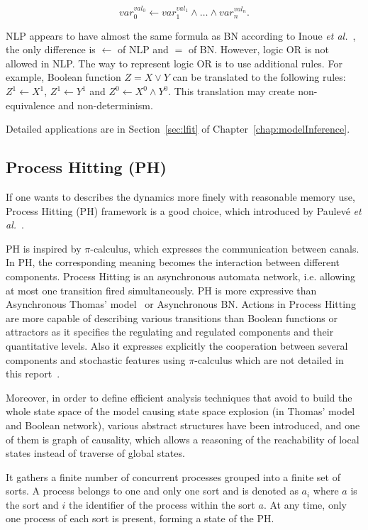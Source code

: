 $$var_0^{val_0} \gets var_1^{val_1}\land \ldots \land var_n^{val_n}.$$

\begin{remark}
NLP appears to have almost the same formula as BN according to Inoue \textit{et al.}~\cite{inoue2011logic}, the only difference is $\gets$ of NLP and $=$ of BN.
However, logic OR is not allowed in NLP.
The way to represent logic OR is to use additional rules.
For example, Boolean function $Z=X\lor Y$ can be translated to the following rules: $Z^1\gets X^1$, $Z^1\gets Y^1$ and $Z^0\gets X^0\land Y^0$.
This translation may create non-equivalence and non-determinism.
\end{remark}

Detailed applications are in Section~\ref{sec:lfit} of Chapter~\ref{chap:modelInference}.

\subsection{Process Hitting (PH)}
If one wants to describes the dynamics more finely with reasonable memory use, Process Hitting (PH) framework is a good choice, which introduced by Paulev\'e \textit{et al.}~\cite{pauleve2011}.

PH is inspired by $\pi$-calculus, which expresses the communication between canals. 
In PH, the corresponding meaning becomes the interaction between different components.
Process Hitting is an asynchronous automata network, i.e. allowing at most one transition fired simultaneously. 
PH is more expressive than Asynchronous Thomas' model~\cite{thomas1978} or Asynchronous BN. 
Actions in Process Hitting are more capable of describing various transitions than Boolean functions or attractors as it specifies the regulating and regulated components and their quantitative levels.
Also it expresses explicitly the cooperation between several components and stochastic features using $\pi$-calculus which are not detailed in this report~\cite{pauleve2014}.

Moreover, in order to define efficient analysis techniques that avoid to build the whole state space of the model causing state space explosion (in Thomas' model and Boolean network), various abstract structures have been introduced, and one of them is graph of causality, which allows a reasoning of the reachability of local states instead of traverse of global states.

It gathers a finite number of concurrent processes grouped into a finite set of sorts. A process belongs to one and only one sort and is denoted as $a_i$ where $a$ is the sort and $i$ the identifier of the process within the sort $a$.
At any time, only one process of each sort is present, forming a state of the PH.

